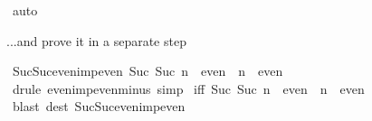 \begin{isabellebody}
\isamarkuptrue%
\ auto\isanewline
\isamarkupfalse%
\isamarkupfalse%
%
\begin{isamarkuptext}%
...and prove it in a separate step%
\end{isamarkuptext}%
\isamarkuptrue%
\ Suc{\isacharunderscore}Suc{\isacharunderscore}even{\isacharunderscore}imp{\isacharunderscore}even{\isacharcolon}\ {\isachardoublequote}Suc\ {\isacharparenleft}Suc\ n{\isacharparenright}\ {\isasymin}\ even\ {\isasymLongrightarrow}\ n\ {\isasymin}\ even{\isachardoublequote}\isanewline
\isamarkupfalse%
\ {\isacharparenleft}drule\ even{\isacharunderscore}imp{\isacharunderscore}even{\isacharunderscore}minus{\isacharunderscore}{}{\isacharcomma}\ simp{\isacharparenright}\isanewline
\isanewline
\isanewline
\isamarkupfalse%
\ {\isacharbrackleft}iff{\isacharbrackright}{\isacharcolon}\ {\isachardoublequote}{\isacharparenleft}{\isacharparenleft}Suc\ {\isacharparenleft}Suc\ n{\isacharparenright}{\isacharparenright}\ {\isasymin}\ even{\isacharparenright}\ {\isacharequal}\ {\isacharparenleft}n\ {\isasymin}\ even{\isacharparenright}{\isachardoublequote}\isanewline
\isamarkupfalse%
\ {\isacharparenleft}blast\ dest{\isacharcolon}\ Suc{\isacharunderscore}Suc{\isacharunderscore}even{\isacharunderscore}imp{\isacharunderscore}even{\isacharparenright}\isanewline
\isanewline
\isamarkupfalse%
\isanewline
\isanewline
\isamarkupfalse%
\end{isabellebody}%
